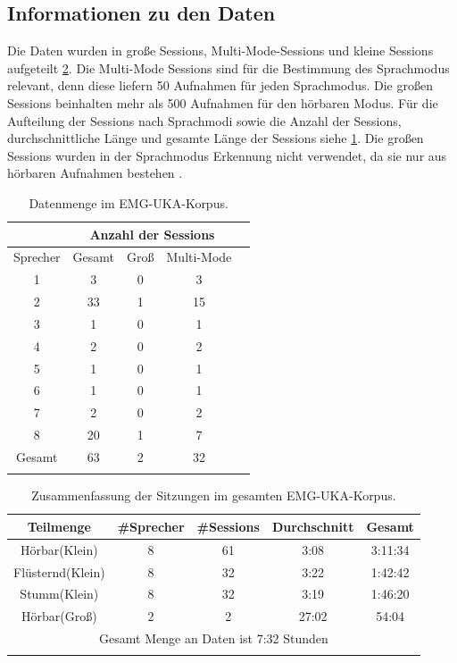 \subsection{Informationen zu den Daten}
Die Daten wurden in große Sessions, Multi-Mode-Sessions und kleine Sessions aufgeteilt \ref{fig:uka3}. Die Multi-Mode Sessions sind für die Bestimmung des Sprachmodus relevant, denn diese liefern 50 Aufnahmen für jeden Sprachmodus. Die großen Sessions beinhalten mehr als 500 Aufnahmen für den hörbaren Modus. Für die Aufteilung der Sessions nach Sprachmodi sowie die Anzahl der Sessions, durchschnittliche Länge und gesamte Länge der Sessions siehe \ref{tab:uka2}. Die großen Sessions wurden in der Sprachmodus Erkennung  nicht verwendet, da sie nur aus hörbaren Aufnahmen bestehen \cite{WaJaSch2014-IS}. 

\begin{table}[H]
 \centering
 \caption{Datenmenge im EMG-UKA-Korpus. \cite{WaJaSch2014-IS}}
\begin{tabular}{|c|cccc|}
\hline 
 & \multicolumn{3}{c}{Anzahl der Sessions} &\\ 
\hline 
 Sprecher& Gesamt & Groß & Multi-Mode & \\ 
\hline 
1 & 3 & 0 & 3 &\\ 
\hline 
2 & 33 & 1 & 15 & \\ 
\hline 
3 & 1 & 0 & 1 &\\ 
\hline 
4 & 2 & 0 & 2 &\\ 
\hline 
5 & 1 & 0 & 1 & \\ 
\hline 
6 & 1 & 0 & 1 & \\ 
\hline 
7 & 2 & 0 & 2 & \\ 
\hline 
8 & 20 & 1 & 7 & \\ 
\hline 
Gesamt & 63 & 2 & 32 & \\ 
\hline   
\label{tab:uka2} 
\end{tabular} 
\end{table}

\begin{table}[H]
 \centering
\caption{Zusammenfassung der Sitzungen im gesamten EMG-UKA-Korpus.\cite{WaJaSch2014-IS} }
\begin{tabular}{|c|c|c|c|c|}
\hline 
Teilmenge & \#Sprecher & \#Sessions & Durchschnitt & Gesamt \\ 
\hline 
Hörbar(Klein) & 8 & 61 & 3:08 & 3:11:34 \\ 
\hline 
Flüsternd(Klein) & 8 & 32 & 3:22 & 1:42:42 \\ 
\hline 
Stumm(Klein) & 8 & 32 & 3:19 & 1:46:20 \\ 
\hline 
Hörbar(Groß) & 2 & 2 & 27:02 & 54:04 \\ 
\hline 
\multicolumn{5}{|c|}{Gesamt Menge an Daten ist 7:32 Stunden} \\ 
\hline
  \label{fig:uka3} 
\end{tabular} 
\end{table}




